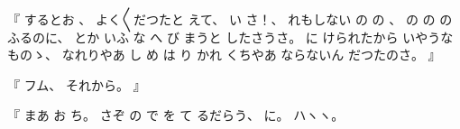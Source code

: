 %
『
するとお
、
%
よく〳〵だつたと
えて、
%
い
さ！、
%
れもしない
の
の
、
%
の
の
の
ふるのに、
%
とか
いふ
な
へ
び
まうと
したさうさ。
%
に%
けられたから
いやうなものゝ、
%
なれりやあ
し
め
は
り
かれ
%
くちやあ
ならないん
だつたのさ。
』

%
『
フム、
%
それから。
』

%
『
まあ
お
ち。
%
さぞ
の
で
を
て
るだらう、
%
に。%
%
ハヽヽ。

